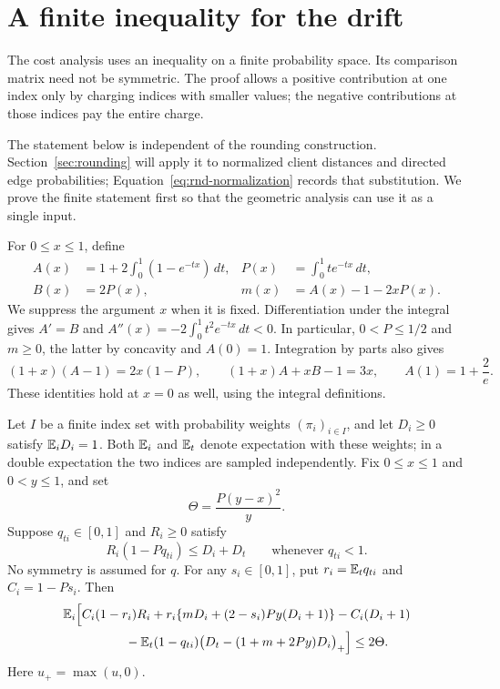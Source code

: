 \section{A finite inequality for the drift}
\label{sec:inequality}

The cost analysis uses an inequality on a finite probability space.  Its
comparison matrix need not be symmetric.  The proof allows a positive
contribution at one index only by charging indices with smaller values;
the negative contributions at those indices pay the entire charge.

The statement below is independent of the rounding construction.
Section~\ref{sec:rounding} will apply it to normalized client distances
and directed edge probabilities; Equation~\ref{eq:rnd-normalization}
records that substitution. We prove the finite statement first so that
the geometric analysis can use it as a single input.

For $0\le x\le1$, define
\begin{equation}
\label{eq:analytic-coefficients}
\begin{aligned}
 A(x)&=1+2\int_0^1(1-e^{-tx})\,dt,&
 P(x)&=\int_0^1te^{-tx}\,dt,\\
 B(x)&=2P(x),& m(x)&=A(x)-1-2xP(x).
\end{aligned}
\end{equation}
We suppress the argument $x$ when it is fixed.  Differentiation under the
integral gives $A'=B$ and
$A''(x)=-2\int_0^1t^2e^{-tx}\,dt<0$.  In particular,
$0<P\le1/2$ and $m\ge0$, the latter by concavity and $A(0)=1$.
Integration by parts also gives
\begin{equation}
\label{eq:analytic-identities}
 (1+x)(A-1)=2x(1-P),\qquad
 (1+x)A+xB-1=3x,\qquad A(1)=1+\frac2e.
\end{equation}
These identities hold at $x=0$ as well, using the integral definitions.

\begin{theorem}
\label{thm:finite-inequality}
Let $I$ be a finite index set with probability weights $(\pi_i)_{i\in I}$,
and let $D_i\ge0$ satisfy $\mathbb E_iD_i=1$.  Both $\mathbb E_i$ and $\mathbb E_t$ denote
expectation with these weights; in a double expectation the two indices
are sampled independently.  Fix $0\le x\le1$ and $0<y\le1$, and set
\[
 \Theta=\frac{P(y-x)^2}{y}.
\]
Suppose $q_{ti}\in[0,1]$ and $R_i\ge0$ satisfy
\begin{equation}
\label{eq:finite-comparison}
 R_i(1-Pq_{ti})\le D_i+D_t\qquad\text{whenever }q_{ti}<1.
\end{equation}
No symmetry is assumed for $q$.  For any $s_i\in[0,1]$, put
$r_i=\mathbb E_tq_{ti}$ and $C_i=1-Ps_i$.  Then
\begin{equation}
\label{eq:finite-inequality}
\begin{aligned}
 \E_i\Big[&C_i(1-r_i)R_i
 +r_i\{mD_i+(2-s_i)Py(D_i+1)\}-C_i(D_i+1)\\
 &\hspace{12mm}
 -\E_t(1-q_{ti})\bigl(D_t-(1+m+2Py)D_i\bigr)_+\Big]
 \le2\Theta.
\end{aligned}
\end{equation}
Here $u_+=\max(u,0)$.
\end{theorem}

